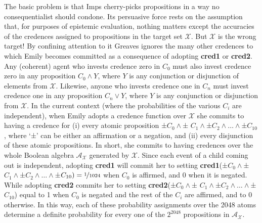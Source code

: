 The basic problem is that Imps cherry-picks propositions in a way no consequentialist should condone. Its persuasive force rests on the assumption that, for purposes of epistemic evaluation, nothing matters except the accuracies of the credences assigned to propositions in the target set $\mathscr{X}$. But $\mathscr{X}$ is the wrong target! By confining attention to it Greaves ignores the many other credences to which Emily becomes committed as a consequence of adopting \textbf{cred1} or \textbf{cred2}. Any (coherent) agent who invests credence zero in $C_0$ must also invest credence zero in any proposition $C_0 \wedge Y$, where $Y$ is any conjunction or disjunction of elements from $\mathscr{X}$. Likewise, anyone who invests credence one in $C_n$ must invest credence one in any proposition $C_n \vee Y$, where $Y$ is any conjunction or disjunction from $\mathscr{X}$. In the current context (where the probabilities of the various $C_i$ are independent), when Emily adopts a credence function over $\mathscr{X}$ she commits to having a credence for (i) every atomic proposition ±$C_0 \wedge $± $C_1 \wedge$±$C_2 \wedge \ldots \wedge$±$C_{10}$, where `±' can be either an affirmation or a negation, and (ii) every disjunction of these atomic propositions. In short, she commits to having credences over the whole Boolean algebra $\mathscr{A}_\mathscr{X}$ generated by $\mathscr{X}$. Since each event of a child coming out is independent, adopting \textbf{cred1} will commit her to setting \textbf{cred1}(±$C_0 \wedge $± $C_1 \wedge$±$C_2 \wedge \ldots \wedge$±$C_{10}) = \nicefrac{1}{1024}$ when $C_0$ is affirmed, and 0 when it is negated. While adopting \textbf{cred2} commits her to setting \textbf{cred2}(±$C_0 \wedge $± $C_1 \wedge$±$C_2 \wedge \ldots \wedge$±$C_{10}$) equal to 1 when $C_0$ is negated and the rest of the $C_i$ are affirmed, and to 0 otherwise. In this way, each of these probability assignments over the 2048 atoms determine a definite probability for every one of the $2^{2048}$ propositions in $\mathscr{A}_\mathscr{X}$. 

